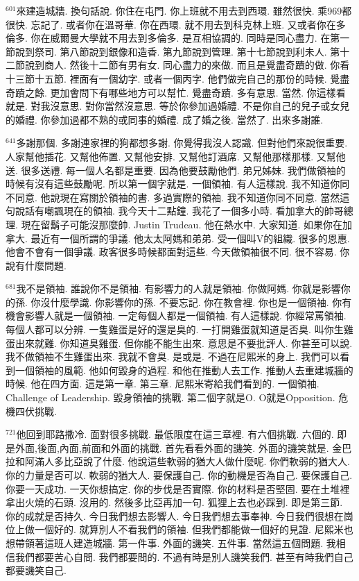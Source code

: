 \documentclass{book}
\begin{document}
$^{601}$來建造城牆.
換句話說.
你住在屯門.
你上班就不用去到西環.
雖然很快.
乘969都很快.
忘記了.
或者你在溫哥華.
你在西環.
就不用去到科克林上班.
又或者你在多倫多.
你在威爾曼大學就不用去到多倫多.
是互相協調的.
同時是同心盡力.
在第一節說到祭司.
第八節說到銀像和造香.
第九節說到管理.
第十七節說到利未人.
第十二節說到商人.
然後十二節有男有女.
同心盡力的來做.
而且是覺盡奇蹟的做.
你看十三節十五節.
裡面有一個幼字.
或者一個丙字.
他們做完自己的那份的時候.
覺盡奇蹟之餘.
更加會問下有哪些地方可以幫忙.
覺盡奇蹟.
多有意思.
當然.
你這樣看就是.
對我沒意思.
對你當然沒意思.
等於你參加過婚禮.
不是你自己的兒子或女兒的婚禮.
你參加過都不熟的或同事的婚禮.
成了婚之後.
當然了.
出來多謝誰.

$^{641}$多謝那個.
多謝連家裡的狗都想多謝.
你覺得我沒人認識.
但對他們來說很重要.
人家幫他插花.
又幫他佈置.
又幫他安排.
又幫他訂酒席.
又幫他那樣那樣.
又幫他送.
很多送禮.
每一個人名都是重要.
因為他要鼓勵他們.
弟兄姊妹.
我們做領袖的時候有沒有這些鼓勵呢.
所以第一個字就是.
一個領袖.
有人這樣說.
我不知道你同不同意.
他說現在寫關於領袖的書.
多過實際的領袖.
我不知道你同不同意.
當然這句說話有嘲諷現在的領袖.
我今天十二點鐘.
我花了一個多小時.
看加拿大的帥哥總理.
現在留鬍子可能沒那麼帥.
Justin Trudeau.
他在熱水中.
大家知道.
如果你在加拿大.
最近有一個所謂的爭議.
他太太阿媽和弟弟.
受一個叫V的組織.
很多的恩惠.
他會不會有一個爭議.
政客很多時候都面對這些.
今天做領袖很不同.
很不容易.
你說有什麼問題.

$^{681}$我不是領袖.
誰說你不是領袖.
有影響力的人就是領袖.
你做阿媽.
你就是影響你的孫.
你沒什麼學識.
你影響你的孫.
不要忘記.
你在教會裡.
你也是一個領袖.
你有機會影響人就是一個領袖.
一定每個人都是一個領袖.
有人這樣說.
你經常罵領袖.
每個人都可以分辨.
一隻雞蛋是好的還是臭的.
一打開雞蛋就知道是否臭.
叫你生雞蛋出來就難.
你知道臭雞蛋.
但你能不能生出來.
意思是不要批評人.
你甚至可以說.
我不做領袖不生雞蛋出來.
我就不會臭.
是或是.
不過在尼熙米的身上.
我們可以看到一個領袖的風範.
他如何毀身的過程.
和他在推動人去工作.
推動人去重建城牆的時候.
他在四方面.
這是第一章.
第三章.
尼熙米寄給我們看到的.
一個領袖.
Challenge of Leadership.
毀身領袖的挑戰.
第二個字就是O.
O就是Opposition.
危機四伏挑戰.

$^{721}$他回到耶路撒冷.
面對很多挑戰.
最低限度在這三章裡.
有六個挑戰.
六個的.
即是外面,後面,內面,前面和外面的挑戰.
首先看看外面的譏笑.
外面的譏笑就是.
金巴拉和阿滿人多比亞說了什麼.
他說這些軟弱的猶大人做什麼呢.
你們軟弱的猶大人.
你的力量是否可以.
軟弱的猶大人.
要保護自己.
你的動機是否為自己.
要保護自己.
你要一天成功.
一天你想搞定.
你的步伐是否實際.
你的材料是否堅固.
要在土堆裡拿出火燒的石頭.
沒用的.
然後多比亞再加一句.
狐狸上去也必踩到.
即是第三節.
你的成就是否持久.
今日我們想去影響人.
今日我們想去事奉神.
今日我們很想在崗位上做一個好的.
就算別人不看我們的領袖.
但我們都能做一個好的見證.
尼熙米也想帶領著這班人建造城牆.
第一件事.
外面的譏笑.
五件事.
當然這五個問題.
我相信我們都要苦心自問.
我們都要問的.
不過有時是別人譏笑我們.
甚至有時我們自己都要譏笑自己.
\end{document}
